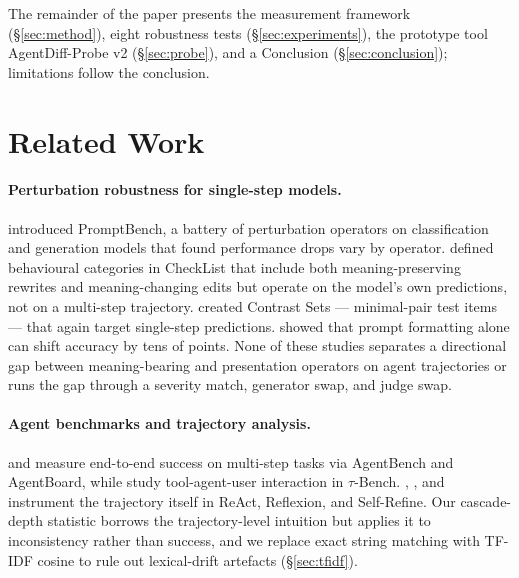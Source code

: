 \documentclass[11pt]{article}
\begin{document}
The remainder of the paper presents the measurement framework (\S\ref{sec:method}), eight robustness tests (\S\ref{sec:experiments}), the prototype tool AgentDiff-Probe v2 (\S\ref{sec:probe}), and a Conclusion (\S\ref{sec:conclusion}); limitations follow the conclusion.

\section{Related Work}
\label{sec:related}

\paragraph{Perturbation robustness for single-step models.} \citet{zhu2024promptbench} introduced PromptBench, a battery of perturbation operators on classification and generation models that found performance drops vary by operator. \citet{ribeiro2020beyond} defined behavioural categories in CheckList that include both meaning-preserving rewrites and meaning-changing edits but operate on the model's own predictions, not on a multi-step trajectory. \citet{gardner2020evaluating} created Contrast Sets --- minimal-pair test items --- that again target single-step predictions. \citet{sclar2024quantifying} showed that prompt formatting alone can shift accuracy by tens of points. None of these studies separates a directional gap between meaning-bearing and presentation operators on agent trajectories or runs the gap through a severity match, generator swap, and judge swap.

\paragraph{Agent benchmarks and trajectory analysis.} \citet{liu2024agentbench} and \citet{yan2024agentboard} measure end-to-end success on multi-step tasks via AgentBench and AgentBoard, while \citet{yao2025tau} study tool-agent-user interaction in $\tau$-Bench. \citet{yao2023react}, \citet{shinn2023reflexion}, and \citet{madaan2023self} instrument the trajectory itself in ReAct, Reflexion, and Self-Refine. Our cascade-depth statistic borrows the trajectory-level intuition but applies it to inconsistency rather than success, and we replace exact string matching with TF-IDF cosine to rule out lexical-drift artefacts (\S\ref{sec:tfidf}).
\end{document}
